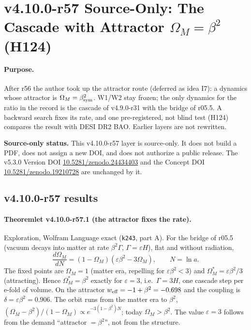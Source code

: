 \clearpage
\section*{v4.10.0-r57 Source-Only: The Cascade with Attractor \texorpdfstring{\(\Omega_M=\beta^2\)}{Omega\_M = beta\^2} (H124)}
\label{sec:v4100-r57-cascade-attractor}

\paragraph{Purpose.}
After r56 the author took up the attractor route (deferred as idea I7): a dynamics whose attractor is \(\Omega_M=\beta_{\rm sym}^2\).  W1/W2 stay frozen; the only
dynamics for the ratio in the record is the cascade of v4.9.0-r31 with the bridge of r05.5.  A backward search fixes its rate, and one pre-registered,
not blind test (H124) compares the result with DESI DR2 BAO.  Earlier layers are not rewritten.

\noindent\textbf{Source-only status.}
This v4.10.0-r57 layer is source-only.  It does not build a PDF, does not assign a new DOI,
and does not authorize a public release.  The v5.3.0 Version DOI
\href{https://doi.org/10.5281/zenodo.24434403}{10.5281/zenodo.24434403} and the Concept DOI
\href{https://doi.org/10.5281/zenodo.19210728}{10.5281/zenodo.19210728} are unchanged by it.

\subsection*{v4.10.0-r57 results}
\label{subsec:v4100-r57-results}

\paragraph{Theoremlet v4.10.0-r57.1 (the attractor fixes the rate).}
Exploration, Wolfram Language exact (\texttt{k243}, part A).  For the bridge of r05.5 (vacuum decays into matter at rate \(\beta^2\Gamma\), \(\Gamma=\varepsilon H\)), flat and
without radiation,
\[
\frac{d\Omega_M}{dN}=(1-\Omega_M)(\varepsilon\beta^2-3\Omega_M),\qquad N=\ln a .
\]
The fixed points are \(\Omega_M=1\) (matter era, repelling for \(\varepsilon\beta^2<3\)) and \(\Omega_M^*=\varepsilon\beta^2/3\) (attracting).  Hence \(\Omega_M^*=\beta^2\) exactly
for \(\varepsilon=3\), i.e.\ \(\Gamma=3H\), one cascade step per e-fold of volume.  On the attractor \(w_{\rm eff}=-1+\beta^2=-0.698\) and the coupling is
\(\delta=\varepsilon\beta^2=0.906\).  The orbit runs from the matter era to \(\beta^2\), \((\Omega_M-\beta^2)/(1-\Omega_M)\propto e^{-3(1-\beta^2)N}\); today \(\Omega_M>\beta^2\).  The
value \(\varepsilon=3\) follows from the demand ``attractor \(=\beta^2\)'', not from the structure.

